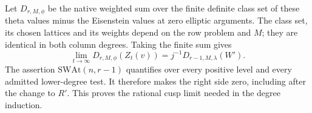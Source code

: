 Let $D_{r,M,\phi}$ be the native weighted sum over the finite definite
class set of these theta values minus the Eisenstein values at zero
elliptic arguments. The class set, its chosen lattices and its weights
depend on the row problem and $M$; they are identical in both column
degrees. Taking the finite sum gives
\[
   \lim_{t\to\infty}D_{r,M,\phi}(Z_t(v))
           =j^{-1}D_{r-1,M,\lambda}(W').
\]
The assertion $\mathrm{SWAt}(n,r-1)$ quantifies over every positive
level and every admitted lower-degree test. It therefore makes the
right side zero, including after the change to $R'$. This proves
the rational cusp limit needed in the degree induction.
